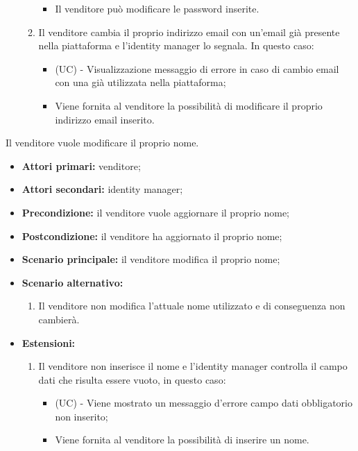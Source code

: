\begin{itemize}
\begin{enumerate}[label=\lett]
\begin{itemize}
    		\item Il venditore può modificare le password inserite.
    	\end{itemize}
    	\item Il venditore cambia il proprio indirizzo email con un'email già presente nella piattaforma e l'identity manager lo segnala. In questo caso:
    	\begin{itemize}
    		\item (UC) - Visualizzazione messaggio di errore in caso di cambio email con una già utilizzata nella piattaforma;
    		\item Viene fornita al venditore la possibilità di modificare il proprio indirizzo email inserito.
    	\end{itemize}
    \end{enumerate}
\end{itemize}

\resetSubUC

Il venditore vuole modificare il proprio nome.
\begin{itemize}
	\item \textbf{Attori primari:} venditore;
	\item \textbf{Attori secondari:} identity manager;
	\item \textbf{Precondizione:} il venditore vuole aggiornare il proprio nome;
	\item \textbf{Postcondizione:} il venditore ha aggiornato il proprio nome;
	\item \textbf{Scenario principale:} il venditore modifica il proprio nome;
	\item \textbf{Scenario alternativo:}
	\begin{enumerate}[label=\lett]
		\item Il venditore non modifica l'attuale nome utilizzato e di conseguenza non cambierà.
	\end{enumerate}
	\item \textbf{Estensioni:}
	\begin{enumerate}[label=\lett]
		\item Il venditore non inserisce il nome e l'identity manager controlla il campo dati che risulta essere vuoto, in questo caso:
		\begin{itemize}
			\item (UC) - Viene mostrato un messaggio d'errore campo dati obbligatorio non inserito;
			\item Viene fornita al venditore la possibilità di inserire un nome.
		\end{itemize}
	\end{enumerate} 
\end{itemize}

